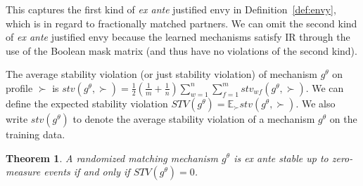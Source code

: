 \documentclass[11pt,letterpaper]{article}
\newtheorem{theorem}{Theorem}
\theoremstyle{definition}
\newcommand{\kibitz}[2]{\ifnum\Comments=1{\color{#1}{#2}}\fi}
\newcommand{\dcp}[1]{\kibitz{orange}{[DCP: #1]}}
\begin{document}
  
This captures the first kind of {\em ex ante} justified envy in Definition~\ref{def:envy}, which is in regard to fractionally matched partners. We can omit the second kind of {\em ex ante} justified envy because the learned mechanisms satisfy IR through the use of the Boolean mask matrix (and thus have no violations of the second kind).



The  average 
 stability violation  (or just stability violation) of  mechanism $g^\theta$ on  profile $\succ$
 is 
$\mathit{stv}(g^\theta, \succ) =  \frac{1}{2}\left(\frac{1}{m}  +\frac{1}{n}\right)\sum_{w = 1}^{n}\sum_{f = 1}^m \mathit{stv}_{wf}{(g^\theta, \succ)}.$
We can define the expected stability violation $\mathit{STV}(g^\theta)=\mathbb{E}_{\succ} \mathit{stv}(g^\theta,\succ)$. We also write  $\mathit{stv}(g^\theta)$ to denote the  average stability violation  of a mechanism $g^\theta$ on the training data.
%
%
%
%
\begin{theorem}\label{thm:stability-violation}
A  randomized matching mechanism $g^\theta$ is ex ante stable up to zero-measure events 
if and only if  $\mathit{STV}(g^\theta)=0$.  
\end{theorem}   
\end{document}
